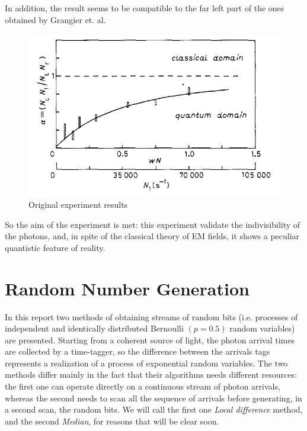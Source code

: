 \documentclass[10pt, final]{article}
\begin{document}
\begin{multicols}{2}
In addition, the result seems to be compatible to the far left part of the ones obtained by Grangier et. al.
\begin{mdframed}
    \begin{figure}[H]
        \centering
        \includegraphics[width = \textwidth]{../images/alpha.png}
        \caption{Original experiment results}
        \label{alpha}
    \end{figure}
\end{mdframed}
So the aim of the experiment is met: this experiment validate the indivisibility of the photons, and, in spite of the classical theory of EM fields, it shows a peculiar quantistic feature of reality. 

\section{Random Number Generation}
In this report two methods of obtaining streams of random bits (i.e. 
 processes of independent and identically distributed Bernoulli $(p = 0.5)$ random variables) are presented.
 Starting from a coherent source of light, the photon arrival times are collected by a time-tagger, so the difference between the arrivals tags represents a realization of a process of exponential random variables. 
 The two methods differ mainly in the fact that their algorithms needs different resources: the first one can operate directly on a continuous stream of photon arrivals, whereas the second needs to scan all the sequence of arrivals before generating, in a second scan, the random bits. We will call the first one \emph{Local difference} method, and the second \emph{Median}, for reasons that will be clear soon.

\end{multicols}
\end{document}
